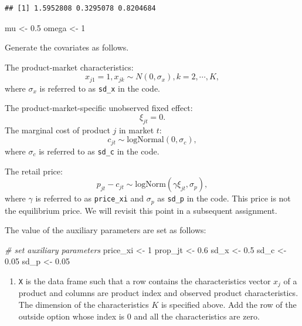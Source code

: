 \documentclass[]{book}
\newenvironment{Shaded}{\begin{snugshade}}{\end{snugshade}}
\newcommand{\DecValTok}[1]{\textcolor[rgb]{0.00,0.00,0.81}{#1}}
\newcommand{\FloatTok}[1]{\textcolor[rgb]{0.00,0.00,0.81}{#1}}
\newcommand{\StringTok}[1]{\textcolor[rgb]{0.31,0.60,0.02}{#1}}
\newcommand{\CommentTok}[1]{\textcolor[rgb]{0.56,0.35,0.01}{\textit{#1}}}
\newcommand{\NormalTok}[1]{#1}
\providecommand{\tightlist}{%
  \setlength{\itemsep}{0pt}\setlength{\parskip}{0pt}}
\begin{document}
\begin{verbatim}
## [1] 1.5952808 0.3295078 0.8204684
\end{verbatim}

\begin{Shaded}
\begin{Highlighting}[]
\NormalTok{mu <-}\StringTok{ }\FloatTok{0.5}
\NormalTok{omega <-}\StringTok{ }\DecValTok{1}
\end{Highlighting}
\end{Shaded}

Generate the covariates as follows.

The product-market characteristics: \[
x_{j1} = 1, x_{jk} \sim N(0, \sigma_x), k = 2, \cdots, K,
\] where \(\sigma_x\) is referred to as \texttt{sd\_x} in the code.

The product-market-specific unobserved fixed effect: \[
\xi_{jt} = 0.
\] The marginal cost of product \(j\) in market \(t\): \[
c_{jt} \sim \text{logNormal}(0, \sigma_c),
\] where \(\sigma_c\) is referred to as \texttt{sd\_c} in the code.

The retail price: \[
p_{jt} - c_{jt} \sim \text{logNorm}(\gamma \xi_{jt}, \sigma_p),
\] where \(\gamma\) is referred to as \texttt{price\_xi} and
\(\sigma_p\) as \texttt{sd\_p} in the code. This price is not the
equilibrium price. We will revisit this point in a subsequent
assignment.

The value of the auxiliary parameters are set as follows:

\begin{Shaded}
\begin{Highlighting}[]
\CommentTok{# set auxiliary parameters}
\NormalTok{price_xi <-}\StringTok{ }\DecValTok{1}
\NormalTok{prop_jt <-}\StringTok{ }\FloatTok{0.6}
\NormalTok{sd_x <-}\StringTok{ }\FloatTok{0.5}
\NormalTok{sd_c <-}\StringTok{ }\FloatTok{0.05}
\NormalTok{sd_p <-}\StringTok{ }\FloatTok{0.05}
\end{Highlighting}
\end{Shaded}

\begin{enumerate}
\def\labelenumi{\arabic{enumi}.}
\setcounter{enumi}{1}
\tightlist
\item
  \texttt{X} is the data frame such that a row contains the
  characteristics vector \(x_{j}\) of a product and columns are product
  index and observed product characteristics. The dimension of the
  characteristics \(K\) is specified above. Add the row of the outside
  option whose index is \(0\) and all the characteristics are zero.
\end{enumerate}
\end{document}
